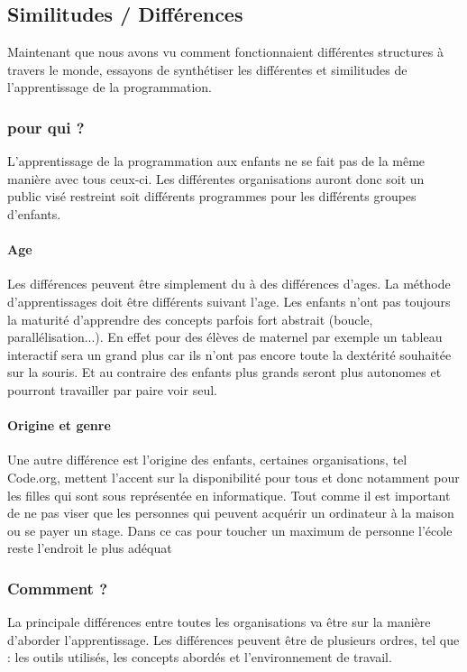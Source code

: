 \subsection{Similitudes / Différences}
Maintenant que nous avons vu comment fonctionnaient différentes structures à travers le monde, essayons de synthétiser les différentes et similitudes de l'apprentissage de la programmation.
\subsubsection{pour qui ?}
L'apprentissage de la programmation aux enfants ne se fait pas de la même manière avec tous ceux-ci. Les différentes organisations auront donc soit un public visé restreint soit différents programmes pour les différents groupes d'enfants. 

\paragraph{Age}
Les différences peuvent être simplement du à des différences d'ages. La méthode d'apprentissages doit être différents suivant l'age. Les enfants n'ont pas toujours la maturité d'apprendre des concepts parfois fort abstrait (boucle, parallélisation...). En effet pour des élèves de maternel par exemple un tableau interactif sera un grand plus car ils n'ont pas encore toute la dextérité souhaitée sur la souris. Et au contraire des enfants plus grands seront plus autonomes et pourront travailler par paire voir seul.

\paragraph{Origine et genre}
Une autre différence est l'origine des enfants, certaines organisations, tel Code.org, mettent l'accent sur la disponibilité pour tous et donc notamment pour les filles qui sont sous représentée en informatique. Tout comme il est important de ne pas viser que les personnes qui peuvent acquérir un ordinateur à la maison ou se payer un stage. Dans ce cas pour toucher un maximum de personne l'école reste l'endroit le plus adéquat

\subsubsection{Commment ?}
La principale différences entre toutes les organisations va être sur la manière d'aborder l'apprentissage. Les différences peuvent être de plusieurs ordres, tel que : les outils utilisés, les concepts abordés et l'environnement de travail.

